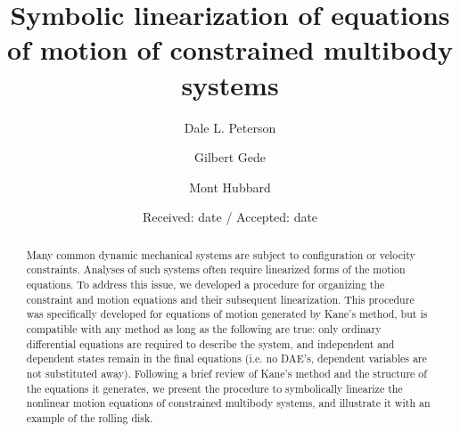 \documentclass[smallcondensed,final]{svjour3}                     %
\begin{document}
\title{Symbolic linearization of equations of motion of constrained multibody systems}


\author{Dale L. Peterson\and Gilbert Gede\and Mont Hubbard}


\date{Received: date / Accepted: date}

\maketitle

\begin{abstract}
Many common dynamic mechanical systems are subject to configuration or velocity
constraints.
Analyses of such systems often require linearized forms of the motion
equations.
To address this issue, we developed a procedure for organizing the constraint
and motion equations and their subsequent linearization.  This procedure was
specifically developed for equations of motion generated by Kane's method, but
is compatible with any method as long as the following are true: only ordinary
differential equations are required to describe the system, and independent and
dependent states remain in the final equations (i.e. no DAE's, dependent
variables are not substituted away).
Following a brief review of Kane's method and the structure of the equations it
generates, we present the procedure to symbolically linearize the nonlinear
motion equations of constrained multibody systems, and illustrate it with an
example of the rolling disk.

\end{abstract}
\end{document}
